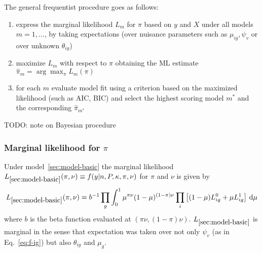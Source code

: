 \documentclass[letterpaper]{article}
\begin{document}
The general frequentist procedure goes as follows:
\begin{enumerate}
\item
express the marginal likelihood \(L_m\) for \(\pi\) based on \(y\)
and \(X\) under all models \(m=1,...\), by taking expectations (over nuisance
parameters such as \(\mu_{ig},\psi_v\) or over unknown \(\theta_{ig}\))
\item 
maximize \(L_m\) with respect to \(\pi\) obtaining the ML estimate
\(\hat{\pi}_m=\arg\max_\pi L_{m}(\pi)\)
\item for each \(m\) evaluate model fit using a criterion based on the
maximized likelihood (such as AIC, BIC) and select the highest scoring model
\(m^*\) and the corresponding \(\hat{\pi}_{m^*}\)
\end{enumerate}

TODO: note on Bayesian procedure

\subsubsection{Marginal likelihood for \(\pi\)}

Under model~\ref{sec:model-basic} the marginal likelihood
\(L_{\ref{sec:model-basic}}(\pi,\nu)\equiv
f(y|n,P,\kappa,\pi,\nu)\) for \(\pi\) and \(\nu\) is given by
\begin{equation}
\label{eq:L-model-basic}
L_{\ref{sec:model-basic}}(\pi,\nu) = b^{-1} \prod_{g} \int_{0}^{1} \mu^{\pi\nu} (1-\mu)^{(1-\pi)\nu}
\prod_{i}
\left[
(1-\mu) L_{ig}^0 + \mu L_{ig}^1
\right]
\, \mathrm{d}\mu
\end{equation}
where \(b\) is the beta function evaluated at \((\pi\nu, (1-\pi)\nu)\).
\(L_{\ref{sec:model-basic}}\) is marginal in the sense that expectation was taken over not only
\(\psi_v\) (as in Eq.~\ref{eq:f-ig}) but also \(\theta_{ig}\) and \(\mu_g\).
\end{document}
